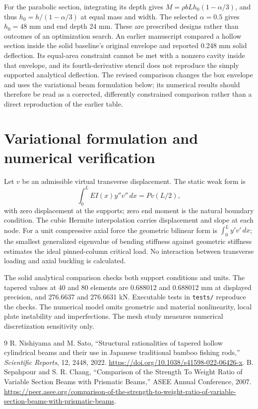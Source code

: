 \documentclass[11pt]{article}
\begin{document}
For the parabolic section, integrating its depth gives $M=\rho bLh_0(1-\alpha/3)$, and thus $h_0=h/(1-\alpha/3)$ at equal mass and width. The selected $\alpha=0.5$ gives $h_0=48$ mm and end depth 24 mm. These are prescribed designs rather than outcomes of an optimization search. An earlier manuscript compared a hollow section inside the solid baseline's original envelope and reported 0.248 mm solid deflection. Its equal-area constraint cannot be met with a nonzero cavity inside that envelope, and its fourth-derivative stencil does not reproduce the simply supported analytical deflection. The revised comparison changes the box envelope and uses the variational beam formulation below; its numerical results should therefore be read as a corrected, differently constrained comparison rather than a direct reproduction of the earlier table.

\section{Variational formulation and numerical verification}
Let $v$ be an admissible virtual transverse displacement. The static weak form is
\begin{equation}\int_0^L EI(x)y''v''\,dx=P v(L/2),\end{equation}
with zero displacement at the supports; zero end moment is the natural boundary condition. The cubic Hermite interpolation carries displacement and slope at each node. For a unit compressive axial force the geometric bilinear form is $\int_0^L y'v'\,dx$; the smallest generalized eigenvalue of bending stiffness against geometric stiffness estimates the ideal pinned-column critical load. No interaction between transverse loading and axial buckling is calculated.

The solid analytical comparison checks both support conditions and units. The tapered values at 40 and 80 elements are 0.688012 and 0.688012 mm at displayed precision, and 276.6637 and 276.6631 kN. Executable tests in \texttt{tests/} reproduce the checks. The numerical model omits geometric and material nonlinearity, local plate instability and imperfections. The mesh study measures numerical discretization sensitivity only.

\begin{thebibliography}{9}
 R. Nishiyama and M. Sato, ``Structural rationalities of tapered hollow cylindrical beams and their use in Japanese traditional bamboo fishing rods,'' \emph{Scientific Reports}, 12, 2448, 2022. \url{https://doi.org/10.1038/s41598-022-06426-x}.
 B. Sepahpour and S. R. Chang, ``Comparison of the Strength To Weight Ratio of Variable Section Beams with Prismatic Beams,'' ASEE Annual Conference, 2007. \url{https://peer.asee.org/comparison-of-the-strength-to-weight-ratio-of-variable-section-beams-with-prismatic-beams}.
\end{thebibliography}
\end{document}
